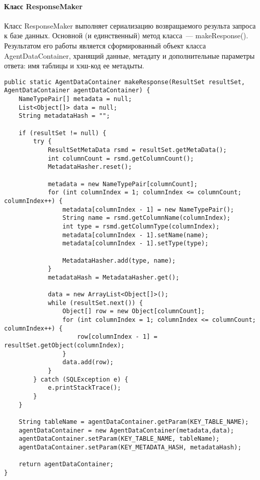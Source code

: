\paragraph{Класс ResponseMaker}
Класс ResponseMaker выполняет сериализацию возвращаемого результа запроса к базе данных. Основной (и единственный) метод класса~--- makeResponse(). Результатом его работы является сформированный объект класса AgentDataContainer, хранящий данные, метадату и дополнительные параметры ответа: имя таблицы и хэш-код ее метадыты.
\begin{lstlisting}
public static AgentDataContainer makeResponse(ResultSet resultSet, AgentDataContainer agentDataContainer) {
    NameTypePair[] metadata = null;
    List<Object[]> data = null;
    String metadataHash = "";

    if (resultSet != null) {
        try {
            ResultSetMetaData rsmd = resultSet.getMetaData();
            int columnCount = rsmd.getColumnCount();
            MetadataHasher.reset();

            metadata = new NameTypePair[columnCount];
            for (int columnIndex = 1; columnIndex <= columnCount; columnIndex++) {
                metadata[columnIndex - 1] = new NameTypePair();
                String name = rsmd.getColumnName(columnIndex);
                int type = rsmd.getColumnType(columnIndex);
                metadata[columnIndex - 1].setName(name);
                metadata[columnIndex - 1].setType(type);

                MetadataHasher.add(type, name);
            }
            metadataHash = MetadataHasher.get();

            data = new ArrayList<Object[]>();
            while (resultSet.next()) {
                Object[] row = new Object[columnCount];
                for (int columnIndex = 1; columnIndex <= columnCount; columnIndex++) {
                    row[columnIndex - 1] = resultSet.getObject(columnIndex);
                }
                data.add(row);
            }
        } catch (SQLException e) {
            e.printStackTrace();
        }
    }

    String tableName = agentDataContainer.getParam(KEY_TABLE_NAME);
    agentDataContainer = new AgentDataContainer(metadata,data);
    agentDataContainer.setParam(KEY_TABLE_NAME, tableName);
    agentDataContainer.setParam(KEY_METADATA_HASH, metadataHash);

    return agentDataContainer;
}
\end{lstlisting}

